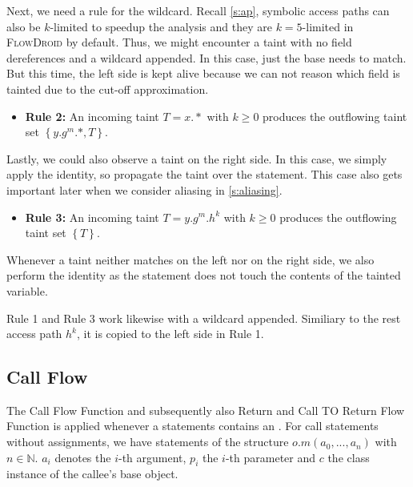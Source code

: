 \documentclass[../draft.tex]{subfiles}
\begin{document}
    Next, we need a rule for the wildcard. Recall \autoref{s:ap}, symbolic access paths can also be $k$-limited to speedup the analysis and they are $k=5$-limited in \textsc{FlowDroid} by default. Thus, we might encounter a taint with no field dereferences and a wildcard appended. In this case, just the base needs to match. But this time, the left side is kept alive because we can not reason which field is tainted due to the cut-off approximation.
    \begin{itemize}
        \item[] \textbf{Rule 2:} An incoming taint $T = x.*$ with $k \geq 0$ produces the outflowing taint set $\left\{y.g^m.*, T\right\}$.
    \end{itemize} 

    Lastly, we could also observe a taint on the right side. In this case, we simply apply the identity, so propagate the taint over the statement. This case also gets important later when we consider aliasing in \autoref{s:aliasing}.
    \begin{itemize}
        \item[] \textbf{Rule 3:} An incoming taint $T = y.g^m.h^k$ with $k \geq 0$ produces the outflowing taint set $\left\{T\right\}$.
    \end{itemize}

    Whenever a taint neither matches on the left nor on the right side, we also perform the identity as the statement does not touch the contents of the tainted variable.  

    Rule 1 and Rule 3 work likewise with a wildcard appended. Similiary to the rest access path $h^k$, it is copied to the left side in Rule 1.

    \subsection{Call Flow}
    The Call Flow Function and subsequently also Return and Call TO Return Flow Function is applied whenever a statements contains an .
    For call statements without assignments, we have statements of the structure $o.m(a_0, ..., a_n)$ with $n \in \mathbb{N}$. $a_i$ denotes the $i$-th argument, $p_i$ the $i$-th parameter and $c$ the class instance of the callee's base object.
\end{document}
